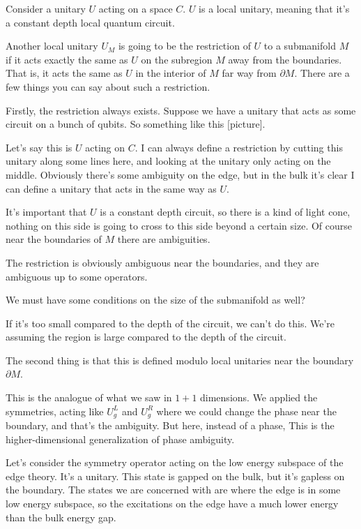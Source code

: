 Consider a unitary $U$ acting on a space $C$.
$U$ is a local unitary,
meaning that it's a constant depth local quantum circuit.

Another local unitary $U_M$ is going to be the restriction of $U$ to a
submanifold $M$
if it acts exactly the same as $U$ on the subregion $M$ away from the
boundaries.
That is,
it acts the same as $U$ in the interior of $M$ far way from $\partial M$.
There are a few things you can say about such a restriction.

Firstly,
the restriction always exists.
Suppose we have a unitary that acts as some circuit on a bunch of qubits.
So something like this [picture].

Let's say this is $U$ acting on $C$.
I can always define a restriction
by cutting this unitary along some lines here,
and looking at the unitary only acting on the middle.
Obviously there's some ambiguity on the edge,
but in the bulk it's clear I can define a unitary that acts in the same way as
$U$.

It's important that $U$ is a constant depth circuit,
so there is a kind of light cone,
nothing on this side is going to cross to this side beyond a certain size.
Of course near the boundaries of $M$ there are ambiguities.

The restriction is obviously ambiguous near the boundaries,
and they are ambiguous up to some operators.

\begin{question}
    We must have some conditions on the size of the submanifold as well?
\end{question}
If it's too small compared to the depth of the circuit,
we can't do this.
We're assuming the region is large compared to the depth of the circuit.

The second thing is that this is defined modulo local unitaries near the
boundary $\partial M$.

This is the analogue of what we saw in $1+1$ dimensions.
We applied the symmetries,
acting like $U_g^L$ and $U_g^R$
where we could change the phase near the boundary,
and that's the ambiguity.
But here,
instead of a phase,
This is the higher-dimensional generalization of phase ambiguity.

Let's consider the symmetry operator
acting on the low energy subspace of the edge theory.
It's a unitary.
This state is gapped on the bulk,
but it's gapless on the boundary.
The states we are concerned with are where the edge is in some low energy
subspace,
so the excitations on the edge have a much lower energy than the bulk energy
gap.

